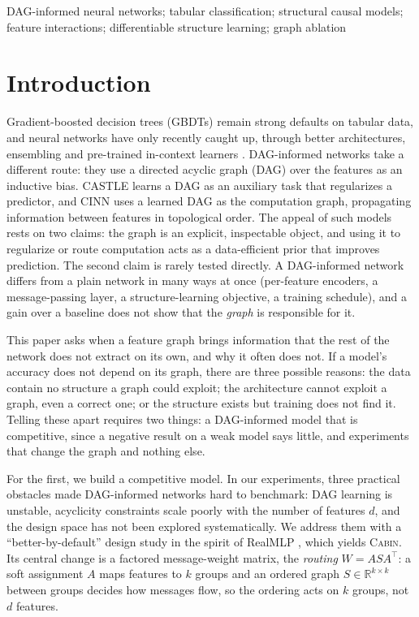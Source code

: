 \documentclass[anon,12pt]{clear2027} %
\newcommand{\Cabin}{\textsc{Cabin}}
\newcommand{\R}{\mathbb{R}}
\newcommand{\T}{^{\top}}
\begin{document}
\begin{keywords}%
DAG-informed neural networks; tabular classification; structural causal models; feature interactions; differentiable structure learning; graph ablation
\end{keywords}

\section{Introduction}
\label{sec:intro}

Gradient-boosted decision trees (GBDTs) remain strong defaults on tabular data, and neural networks have only recently caught up, through better architectures, ensembling and pre-trained in-context learners \citep{grinsztajn2022tree,gorishniy2024tabm,holzmuller2024better,qu2025tabicl}. DAG-informed networks take a different route: they use a directed acyclic graph (DAG) over the features as an inductive bias. CASTLE \citep{kyono2020castle} learns a DAG as an auxiliary task that regularizes a predictor, and CINN \citep{zhang2024cinn} uses a learned DAG as the computation graph, propagating information between features in topological order. The appeal of such models rests on two claims: the graph is an explicit, inspectable object, and using it to regularize or route computation acts as a data-efficient prior that improves prediction. The second claim is rarely tested directly. A DAG-informed network differs from a plain network in many ways at once (per-feature encoders, a message-passing layer, a structure-learning objective, a training schedule), and a gain over a baseline does not show that the \emph{graph} is responsible for it.

This paper asks when a feature graph brings information that the rest of the network does not extract on its own, and why it often does not. If a model's accuracy does not depend on its graph, there are three possible reasons: the data contain no structure a graph could exploit; the architecture cannot exploit a graph, even a correct one; or the structure exists but training does not find it. Telling these apart requires two things: a DAG-informed model that is competitive, since a negative result on a weak model says little, and experiments that change the graph and nothing else.

For the first, we build a competitive model. In our experiments, three practical obstacles made DAG-informed networks hard to benchmark: DAG learning is unstable, acyclicity constraints scale poorly with the number of features $d$, and the design space has not been explored systematically. We address them with a ``better-by-default'' design study in the spirit of RealMLP \citep{holzmuller2024better}, which yields \Cabin{}. Its central change is a factored message-weight matrix, the \emph{routing} $W=ASA\T$: a soft assignment $A$ maps features to $k$ groups and an ordered graph $S\in\R^{k\times k}$ between groups decides how messages flow, so the ordering acts on $k$ groups, not $d$ features.
\end{document}
